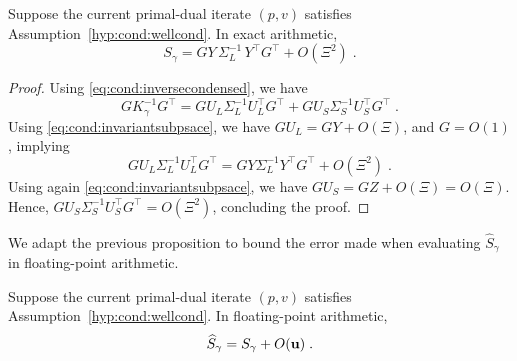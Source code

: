 \begin{proposition}
  Suppose the current primal-dual iterate $(p, v)$ satisfies Assumption~\ref{hyp:cond:wellcond}.
  In exact arithmetic,
  \begin{equation}
    S_\gamma = GY \, \Sigma_L^{-1} \, Y^\top G^\top + O(\Xi^2) \; .
  \end{equation}
\end{proposition}
\begin{proof}
  Using \eqref{eq:cond:inversecondensed}, we have
  \begin{equation}
    G K_\gamma^{-1} G^\top =
    G U_L \Sigma_L^{-1} U_L^\top G^\top + G U_S \Sigma_S^{-1} U_S^\top G^\top \;.
  \end{equation}
  Using \eqref{eq:cond:invariantsubpsace}, we have $G U_L = GY + O(\Xi)$,
  and $G = O(1)$, implying
  \begin{equation}
    G U_L \Sigma_L^{-1} U_L^\top G^\top = G Y  \Sigma_L^{-1} Y^\top G^\top + O(\Xi^2) \; .
  \end{equation}
  Using again \eqref{eq:cond:invariantsubpsace}, we have $G U_S = GZ + O(\Xi) = O(\Xi)$.
  Hence, $G U_S \Sigma_S^{-1} U_S^\top G^\top = O(\Xi^2)$,
  concluding the proof.
\end{proof}
We adapt the previous proposition to bound the error made when evaluating
$\widehat{S}_\gamma$ in floating-point arithmetic.
\begin{proposition}
  Suppose the current primal-dual iterate $(p, v)$ satisfies Assumption~\ref{hyp:cond:wellcond}.
  In floating-point arithmetic,
  \begin{equation}
    \label{eq:cond:errorSgamma}
    \widehat{S}_\gamma = S_\gamma + O(\mathbf{u}) \; .
  \end{equation}
\end{proposition}
